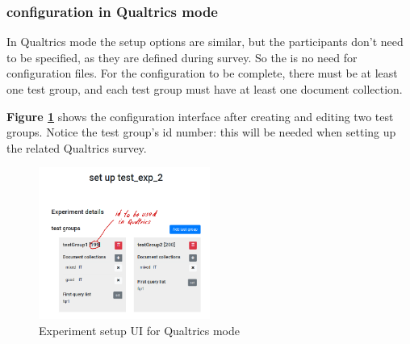 \documentclass[fleqn]{article}
\begin{document}
\newpage

\subsubsection{configuration in Qualtrics mode}

In Qualtrics mode the setup options are similar, but the participants don't need to be specified, as they are defined during survey.
So the is no need for configuration files. For the configuration to be complete, there must be at least one test group, and each test group
must have at least one document collection. 

\textbf{Figure \ref{fig:expSetupUi2}} shows the configuration interface after creating and editing
two test groups. Notice the test group's id number: this will be needed when setting up the related Qualtrics survey. 

\begin{figure} [h]
\centering
\includegraphics[width=0.5\textwidth]{img/expSetupUi2}
\caption{Experiment setup UI for Qualtrics mode}
\label{fig:expSetupUi2}
\end{figure}
\end{document}

